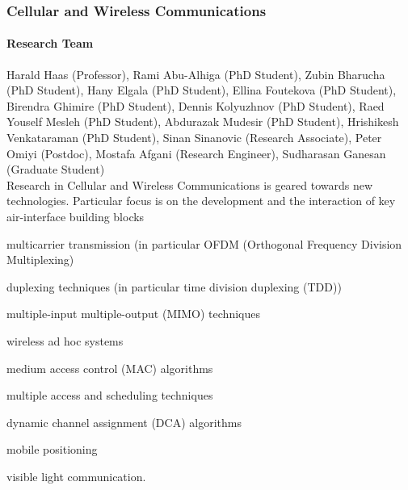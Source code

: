 
\subsubsection{Cellular and Wireless Communications}
\label{Haas1} 

\paragraph{Research Team}
Harald Haas (Professor), Rami Abu-Alhiga (PhD Student), Zubin
Bharucha (PhD Student), Hany Elgala (PhD Student), Ellina Foutekova
(PhD Student), Birendra Ghimire (PhD Student), Dennis Kolyuzhnov
(PhD Student),  Raed Youself Mesleh (PhD Student), Abdurazak Mudesir
(PhD Student), Hrishikesh Venkataraman (PhD Student), Sinan
Sinanovic (Research Associate), Peter Omiyi (Postdoc), Mostafa
Afgani (Research Engineer), Sudharasan Ganesan (Graduate Student)\\

Research in Cellular and Wireless Communications is geared towards
new technologies. Particular focus is  on the development and the
interaction of key air-interface building blocks \newpage

\begin{myitemize}
\item multicarrier transmission (in particular OFDM (Orthogonal Frequency Division
Multiplexing)
\item duplexing techniques (in particular time division duplexing
(TDD))
\item multiple-input multiple-output (MIMO) techniques
\item wireless ad hoc systems
\item medium access control (MAC) algorithms
\item multiple access and scheduling techniques
\item dynamic channel assignment (DCA) algorithms
\item mobile positioning
\item visible light communication.
\end{myitemize}

